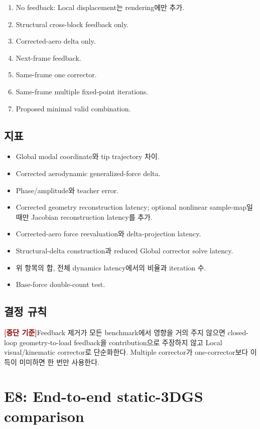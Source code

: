 \documentclass[11pt,a4paper]{article}
\newcommand{\killgate}{\textcolor{darkred}{\textbf{[중단 기준]}}}
\begin{document}
\begin{enumerate}[leftmargin=1.7em]
  \item No feedback: Local displacement는 rendering에만 추가.
  \item Structural cross-block feedback only.
  \item Corrected-aero delta only.
  \item Next-frame feedback.
  \item Same-frame one corrector.
  \item Same-frame multiple fixed-point iterations.
  \item Proposed minimal valid combination.
\end{enumerate}

\subsection*{지표}

\begin{itemize}[leftmargin=1.5em]
  \item Global modal coordinate와 tip trajectory 차이.
  \item Corrected aerodynamic generalized-force delta.
  \item Phase/amplitude와 teacher error.
  \item Corrected geometry reconstruction latency;
  optional nonlinear sample-map일 때만 Jacobian reconstruction latency를 추가.
  \item Corrected-aero force reevaluation와 delta-projection latency.
  \item Structural-delta construction과 reduced Global corrector solve latency.
  \item 위 항목의 합, 전체 dynamics latency에서의 비율과 iteration 수.
  \item Base-force double-count test.
\end{itemize}

\subsection*{결정 규칙}

\killgate Feedback 제거가 모든 benchmark에서 영향을 거의 주지 않으면
closed-loop geometry-to-load feedback을 contribution으로 주장하지 않고
Local visual/kinematic corrector로 단순화한다.
Multiple corrector가 one-corrector보다 이득이 미미하면 한 번만 사용한다.

\section{E8: End-to-end static-3DGS comparison}
\end{document}
